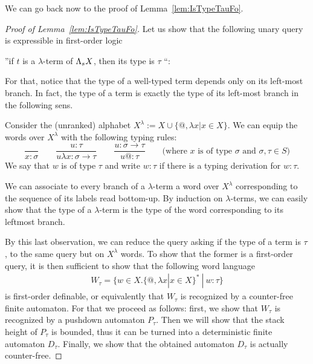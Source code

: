 We can go back now to the proof of Lemma~\ref{lem:IsTypeTauFo}.
\begin{proof}[Proof of Lemma~\ref{lem:IsTypeTauFo}]
Let us show that the following unary query is expressible in first-order logic
\begin{center}
''if $t$ is a $\lambda$-term of $\Lambda_{s} X$, then its type is $\tau$ ``:
\end{center}
 For that, notice that the type of a well-typed term depends only on its left-most branch. In fact, the type of a term is exactly the type of its left-most branch in the following sens.

Consider the (unranked) alphabet $ X^\lambda:= X\cup \{@, \lambda x | x\in X\}$. We can equip the words over $X^\lambda$ with the following typing rules:
$$\frac{}{x: \sigma} \qquad \frac{u:\tau}{u\lambda x: \sigma\rightarrow \tau} \qquad \frac{u:\sigma\rightarrow\tau}{u@:\tau}\qquad\text{(where $x$ is of type $\sigma$ and $\sigma,\tau \in S$)}$$
We say that $w$ is of type $\tau$ and write $w:\tau$ if there is a typing derivation for $w:\tau$.

We can associate to every branch of a $\lambda$-term a word over $X^\lambda$ corresponding to the sequence of its labels read bottom-up. By induction on $\lambda$-terms, we can easily show that the type of a $\lambda$-term is the type of the word corresponding to its leftmost branch. 

By this last observation, we can reduce the query asking if the type of a term is $\tau$, to the same query but on $X^\lambda$ words. To show that the former is a first-order query, it is then sufficient to show that the following word language 
\begin{align*}
W_\tau = \{w\in X.\{@, \lambda x | x\in X\}^*\ |\ w:\tau \} 
\end{align*}
is first-order definable, or equivalently that  $W_\tau$ is recognized by a counter-free  finite automaton. For that we proceed as follows: first, we show that $W_\tau$ is recognized by a pushdown automaton $P_\tau$. Then we will show that the stack height of $P_\tau$ is bounded, thus it can be turned into a deterministic finite automaton $D_\tau$. Finally, we show that the obtained automaton $D_\tau$ is actually counter-free.  



\end{proof}
